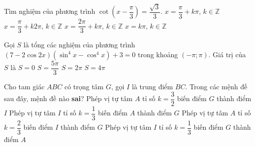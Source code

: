\begin{ex}%
Tìm nghiệm của phương trình $\cot\left(x-\dfrac{\pi}{3}\right)=\dfrac{\sqrt{3}}{3}$.
\choice 
{$x=\dfrac{\pi}{3}+k\pi,\, k\in \mathbb{Z}$}
{$x=\dfrac{\pi}{3}+k2\pi,\, k\in \mathbb{Z}$}
{\True $x=\dfrac{2\pi}{3}+k\pi,\, k\in \mathbb{Z}$}
{$x=k\pi,\, k\in \mathbb{Z}$}
\end{ex}
\begin{ex}%
Gọi $S$ là tổng các nghiệm của phương trình $\left(7-2\cos{2x}\right)\left(\sin^{4}{x}-\cos^{4}{x}\right)+3=0$ trong khoảng $\left(-\pi;\pi\right)$. Giá trị của $S$ là
\choice 
{\True $S=0$}
{$S=\dfrac{5\pi}{3}$}
{$S=2\pi$}
{$S=4\pi$}
\end{ex}
\begin{ex}%
Cho tam giác $ABC$ có trọng tâm $G$, gọi $I$ là trung điểm $BC$. Trong các mệnh đề sau đây, mệnh đề nào \textbf{sai}?
\choice
{Phép vị tự tâm $A$ tỉ số $k=\dfrac{3}{2}$ biến điểm $G$ thành điểm $I$}
{Phép vị tự tâm $I$ tỉ số $k=\dfrac{1}{3}$ biến điểm $A$ thành điểm $G$}
{Phép vị tự tâm $A$ tỉ số $k=\dfrac{2}{3}$ biến điểm $I$ thành điểm $G$}
{\True Phép vị tự tâm $I$ tỉ số $k=\dfrac{1}{3}$ biến điểm $G$ thành điểm $A$}
\end{ex}
